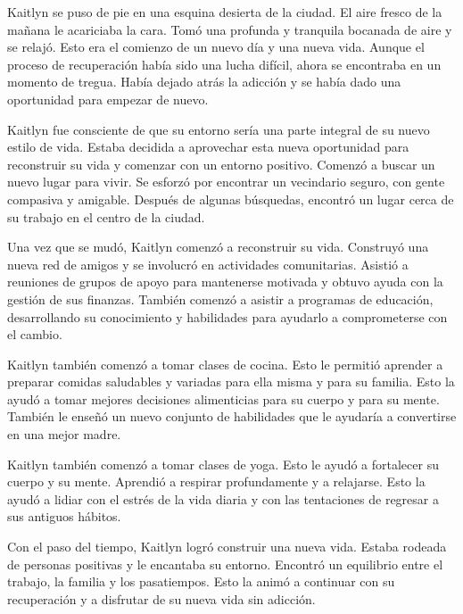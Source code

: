 

Kaitlyn se puso de pie en una esquina desierta de la ciudad. El aire fresco de la mañana le acariciaba la cara. Tomó una profunda y tranquila bocanada de aire y se relajó. Esto era el comienzo de un nuevo día y una nueva vida. Aunque el proceso de recuperación había sido una lucha difícil, ahora se encontraba en un momento de tregua. Había dejado atrás la adicción y se había dado una oportunidad para empezar de nuevo.

Kaitlyn fue consciente de que su entorno sería una parte integral de su nuevo estilo de vida. Estaba decidida a aprovechar esta nueva oportunidad para reconstruir su vida y comenzar con un entorno positivo. Comenzó a buscar un nuevo lugar para vivir. Se esforzó por encontrar un vecindario seguro, con gente compasiva y amigable. Después de algunas búsquedas, encontró un lugar cerca de su trabajo en el centro de la ciudad.

Una vez que se mudó, Kaitlyn comenzó a reconstruir su vida. Construyó una nueva red de amigos y se involucró en actividades comunitarias. Asistió a reuniones de grupos de apoyo para mantenerse motivada y obtuvo ayuda con la gestión de sus finanzas. También comenzó a asistir a programas de educación, desarrollando su conocimiento y habilidades para ayudarlo a comprometerse con el cambio.

Kaitlyn también comenzó a tomar clases de cocina. Esto le permitió aprender a preparar comidas saludables y variadas para ella misma y para su familia. Esto la ayudó a tomar mejores decisiones alimenticias para su cuerpo y para su mente. También le enseñó un nuevo conjunto de habilidades que le ayudaría a convertirse en una mejor madre.

Kaitlyn también comenzó a tomar clases de yoga. Esto le ayudó a fortalecer su cuerpo y su mente. Aprendió a respirar profundamente y a relajarse. Esto la ayudó a lidiar con el estrés de la vida diaria y con las tentaciones de regresar a sus antiguos hábitos.

Con el paso del tiempo, Kaitlyn logró construir una nueva vida. Estaba rodeada de personas positivas y le encantaba su entorno. Encontró un equilibrio entre el trabajo, la familia y los pasatiempos. Esto la animó a continuar con su recuperación y a disfrutar de su nueva vida sin adicción.